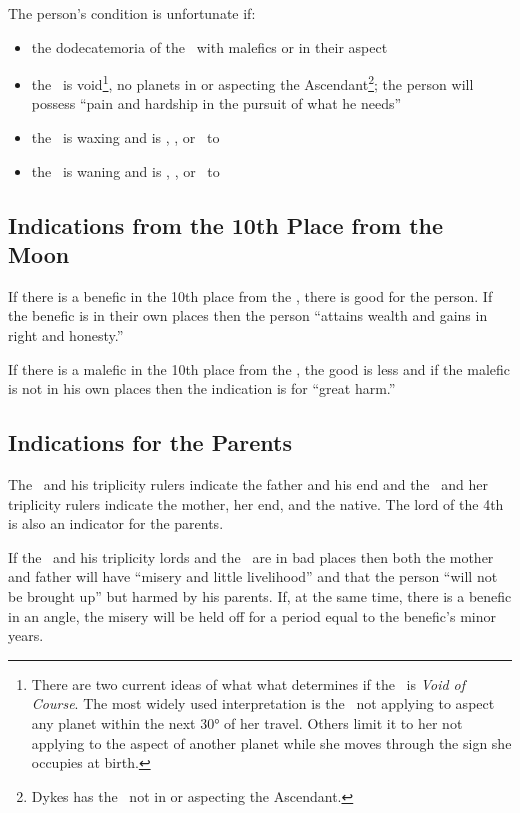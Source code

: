 \noindent The person's condition is unfortunate if:
\begin{itemize}[topsep=0em,itemsep=0em]
\item the dodecatemoria of the \Moon\, with malefics or in their aspect
\item the \Moon\, is void\footnote{There are two current ideas of what what determines if the \Moon\, is \textsl{Void of Course}. The most widely used interpretation is the \Moon\, not applying to aspect any planet within the next 30° of her travel. Others limit it to her not applying to the aspect of another planet while she moves through the sign she occupies at birth.}, no planets in or aspecting the Ascendant\footnote{Dykes has the \Moon\, not in or aspecting the Ascendant.}; the  person will possess ``pain and hardship in the pursuit of what he needs''
\item the \Moon\, is waxing and is \Conjunction, \Opposition, or \Square\, to \Mars
\item the \Moon\, is waning and is \Conjunction, \Opposition, or \Square\, to \Saturn
\end{itemize}

\subsection{Indications from the 10th Place from the Moon}

If there is a benefic in the 10th place from the \Moon, there is good for the person. If the benefic is in their own places then the person ``attains wealth and gains in right and honesty.''

If there is a malefic in the 10th place from the \Moon, the good is less and if the malefic is not in his own places then the indication is for ``great harm.''

\subsection{Indications for the Parents}
The \Sun\, and his triplicity rulers indicate the father and his end and the \Moon\, and her triplicity rulers indicate the mother, her end, and the native. The lord of the 4th is also an indicator for the parents.

If the \Sun\, and his triplicity lords and the \Moon\, are in bad places then both the mother and father will have ``misery and little livelihood'' and that the person ``will not be brought up'' but harmed by his parents. If, at the same time, there is a benefic in an angle, the misery will be held off for a period equal to the benefic's minor years.

